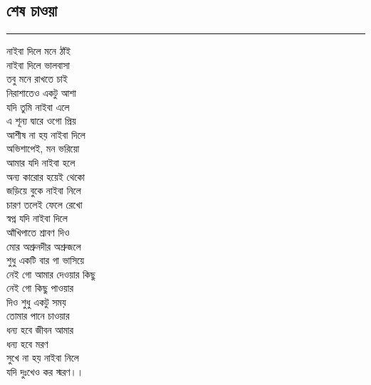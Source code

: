 \documentclass[12pt]{article}
\begin{document}
\subsection*{শেষ চাওয়া }
\hrule
\vspace{1in}
নাইবা দিলে মনে ঠাঁই\\
নাইবা দিলে ভালবাসা\\
তবু মনে রাখতে চাই\\
নিরাশাতেও একটু আশা\\
যদি তুমি নাইবা এলে\\
এ শূন্য দ্বারে ওগো প্রিয়\\
আশীষ না হয় নাইবা দিলে\\
অভিশাপেই, মন ভরিয়ো\\
আমার যদি নাইবা হলে\\
অন্য কারোর হয়েই থেকো\\
জড়িয়ে বুকে নাইবা নিলে\\
চারণ তলেই ফেলে রেখো\\
স্বপ্ন যদি নাইবা দিলে\\
আঁখিপাতে শ্রাবণ দিও\\
মোর অশ্রুনদীর অশ্রুজলে\\
শুধু একটি বার গা ভাসিয়ে\\
নেই গো আমার দেওয়ার কিছু\\
নেই গো কিছু পাওয়ার\\
দিও শুধু একটু সময়\\
তোমার পানে চাওয়ার\\
ধন্য হবে জীবন আমার\\
ধন্য হবে মরণ\\
সুখে না হয় নাইবা নিলে\\
যদি দুঃখেও কর স্মরণ।।\\
\newpage
\end{document}
